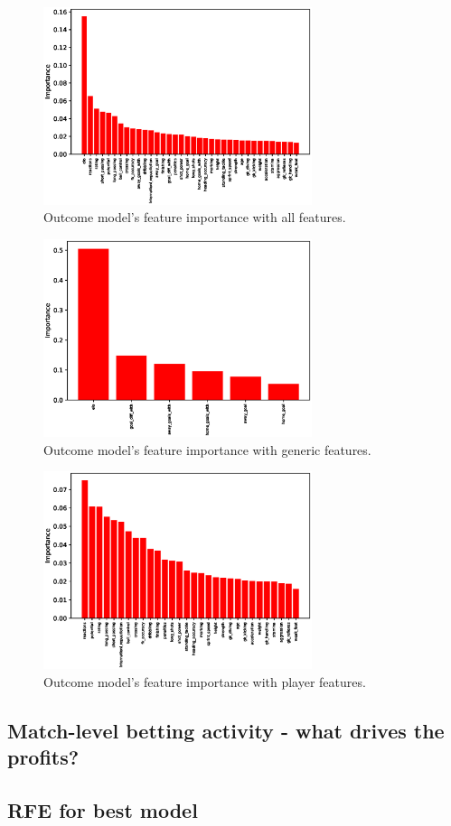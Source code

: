 \begin{figure}[H]
    \centering
    \includegraphics[width=0.7\textwidth]{img/match_level_2018_outcome_feature_importance_af_feature_importance.eps}
    \caption{Outcome model's feature importance with all features.}
    \label{fig:outcome_feature_importance_af}
\end{figure}

\begin{figure}[H]
    \centering
    \includegraphics[width=0.7\textwidth]{img/match_level_2018_outcome_feature_importance_gf_feature_importance.eps}
    \caption{Outcome model's feature importance with generic features.}
    \label{fig:outcome_feature_importance_gf}
\end{figure}

\begin{figure}[H]
    \centering
    \includegraphics[width=0.7\textwidth]{img/match_level_2018_outcome_feature_importance_pf_feature_importance.eps}
    \caption{Outcome model's feature importance with player features.}
    \label{fig:outcome_feature_importance_pf}
\end{figure}


\subsection{Match-level betting activity - what drives the profits?}
\subsection{RFE for best model}
